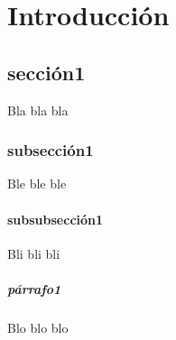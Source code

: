 \chapter{Introducción}\label{cap.introduccion}
\section{sección1}
Bla bla bla
\subsection{subsección1}
Ble ble ble
\subsubsection{subsubsección1}
Bli bli bli
\paragraph{párrafo1}
Blo blo blo